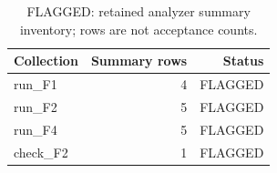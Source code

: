 \begin{table}[H]
\centering\small
\caption{FLAGGED: retained analyzer summary inventory; rows are not acceptance counts.}\label{tab:analyzer}
\begin{tabular}{lrr}
\toprule
Collection & Summary rows & Status \\
\midrule
run\_F1 & 4 & FLAGGED \\
run\_F2 & 5 & FLAGGED \\
run\_F4 & 5 & FLAGGED \\
check\_F2 & 1 & FLAGGED \\
\bottomrule
\end{tabular}
\end{table}
